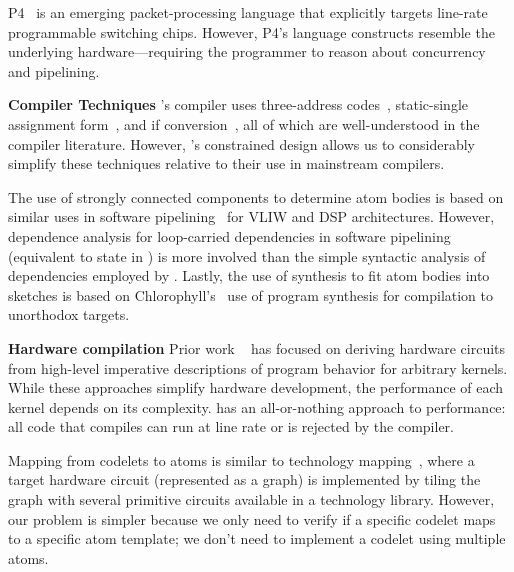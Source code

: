 P4~\cite{p4} is an emerging packet-processing language that explicitly targets
line-rate programmable switching chips. However, P4's language constructs
resemble the underlying hardware---requiring the programmer to reason about
concurrency and pipelining.

\textbf{Compiler Techniques}
\pktlanguage's compiler uses three-address codes~\cite{tac}, static-single
assignment form~\cite{ssa}, and if conversion~\cite{if_conversion}, all of
which are well-understood in the compiler literature. However, \pktlanguage's
constrained design allows us to considerably simplify these techniques relative
to their use in mainstream compilers.

The use of strongly connected components to determine atom bodies is based on
similar uses in software pipelining~\cite{software_pipelining} for VLIW and DSP
architectures. However, dependence analysis for loop-carried dependencies in
software pipelining (equivalent to state in \pktlanguage) is more involved than
the simple syntactic analysis of dependencies employed by \pktlanguage. Lastly,
the use of synthesis to fit atom bodies into sketches is based on
Chlorophyll's~\cite{chlorophyll} use of program synthesis for compilation to
unorthodox targets.

\textbf{Hardware compilation}
Prior work ~\cite{nurvadathi, cash, bluespec} has focused on deriving hardware
circuits from high-level imperative descriptions of program behavior for
arbitrary kernels. While these approaches simplify hardware development, the
performance of each kernel depends on its complexity.  \pktlanguage has an
all-or-nothing approach to performance: all code that compiles can run at
line rate or is rejected by the compiler.

Mapping from codelets to atoms is similar to technology mapping~\cite{micheli,
flowmap, spectransform}, where a target hardware circuit (represented as a
graph) is implemented by tiling the graph with several primitive circuits
available in a technology library. However, our problem is simpler because we
only need to verify if a specific codelet maps to a specific atom template; we
don't need to implement a codelet using multiple atoms.
